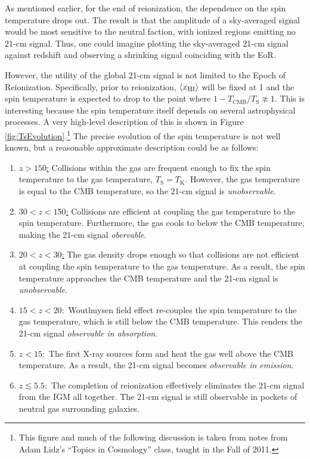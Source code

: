 As mentioned earlier, for the end of reionization, the dependence on the spin temperature drops out. The result is that the amplitude of a sky-averaged signal  would be most sensitive to the neutral faction, with ionized regions emitting no 21-cm signal. Thus, one could imagine plotting the sky-averaged 21-cm signal against redshift and observing a shrinking signal coinciding with the EoR. 


However, the utility of the global 21-cm signal is not limited to the Epoch of Reionization. Specifically, prior to reionization, $\langle x_{\text{HI}}\rangle$ will be fixed at 1 and the spin temperature is expected to drop to the point where $1 - T_{\text{CMB}}/T_{\text{S}} \not\approx 1$. This is interesting because the spin temperature itself depends on several astrophysical processes. A very high-level description of this is shown in Figure \ref{fig:TsEvolution}.\footnote{This figure and much of the following discussion is taken from notes from Adam Lidz's ``Topics in Cosmology'' class, taught in the Fall of 2011.} The precise evolution of the spin temperature is not well known, but a reasonable approximate description could be as follows:

\begin{enumerate}
\item [] \underline{$z > 150$:} Collisions within the gas are frequent enough to fix the spin temperature to the gas temperature, $T_{\text{S}} = T_{\text{K}}$. However, the gas temperature is equal to the CMB temperature, so the 21-cm signal is \textit{unobservable}.
\item [] \underline{$30 < z < 150$:} Collisions are efficient at coupling the gas temperature to the spin temperature. Furthermore, the gas cools to below the CMB temperature, making the 21-cm signal \textit{obervable}. 
\item [] \underline{$20 < z < 30$:} The gas density drops enough so that collisions are not efficient at coupling the spin temperature to the gas temperature. As a result, the spin temperature approaches the CMB temperature and the 21-cm signal is \textit{unobservable}. 
\item [] \underline{$15 < z < 20:$} Wouthuysen field effect re-couples the spin temperature to the gas temperature, which is still below the CMB temperature. This renders the 21-cm signal \textit{observable in absorption}. 
\item [] \underline{$ z < 15:$} The first X-ray sources form and heat the gas well above the CMB temperature. As a result, the 21-cm signal becomes \textit{observable in emission}.
\item [] \underline{$ z \lesssim 5.5:$} The completion of reionization effectively eliminates the 21-cm signal from the IGM all together. The 21-cm signal is still observable in pockets of neutral gas surrounding galaxies. 
\end{enumerate}


